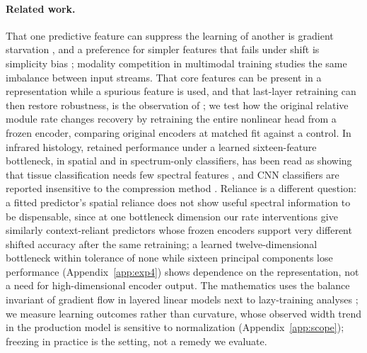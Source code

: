 \paragraph{Related work.}
That one predictive feature can suppress the learning of another is
gradient starvation \citep{pezeshki2021gradient}, and a preference for
simpler features that fails under shift is simplicity bias
\citep{shah2020pitfalls}; modality competition in multimodal training
\citep{wang2020what,peng2022balanced,huang2022modality,du2023unimodal}
studies the same imbalance between input streams. That core features can
be present in a representation while a spurious feature is used, and that
last-layer retraining can then restore robustness, is the observation of
\citet{kirichenko2023dfr}; we test how the original relative module rate
changes recovery by retraining the entire nonlinear head from a frozen
encoder, comparing original encoders at matched fit against a control.
In infrared histology, retained performance under a learned
sixteen-feature bottleneck, in spatial and in spectrum-only classifiers,
has been read as showing that tissue classification needs few spectral
features \citep{oleary2026spatial}, and CNN classifiers are reported
insensitive to the compression method \citep{mueller2023dimred}.
Reliance is a different question: a fitted predictor's spatial reliance
does not show useful spectral information to be dispensable, since at one
bottleneck dimension our rate interventions give similarly
context-reliant predictors whose frozen encoders support very different
shifted accuracy after the same retraining; a learned twelve-dimensional
bottleneck within tolerance of none while sixteen principal components
lose performance (Appendix~\ref{app:exp4}) shows dependence on the
representation, not a need for high-dimensional encoder output. The mathematics
uses the balance invariant of gradient flow in layered linear models
\citep{astra_du2018balance,astra_saxe2014,astra_yun2021} next to
lazy-training analyses \citep{chizat2019lazy,yang2021tensor}; we measure
learning outcomes rather than curvature, whose observed width trend in
the production model is sensitive to normalization
\citep{karakida2019universal,vanlaarhoven2017l2}
(Appendix~\ref{app:scope}); freezing in practice
\citep{zhang2022layers,coil2025freezing} is the setting, not a remedy we
evaluate.
